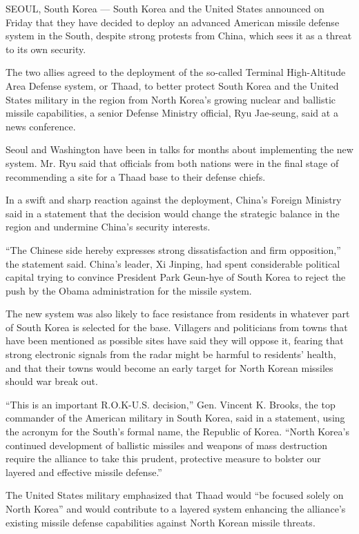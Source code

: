 SEOUL, South Korea --- South Korea and the United States announced on
Friday that they have decided to deploy an advanced American missile
defense system in the South, despite strong protests from China, which
sees it as a threat to its own security.

The two allies agreed to the deployment of the so-called Terminal
High-Altitude Area Defense system, or Thaad, to better protect South
Korea and the United States military in the region from North Korea's
growing nuclear and ballistic missile capabilities, a senior Defense
Ministry official, Ryu Jae-seung, said at a news conference.

Seoul and Washington have been in talks for months about implementing
the new system. Mr. Ryu said that officials from both nations were in
the final stage of recommending a site for a Thaad base to their defense
chiefs.

In a swift and sharp reaction against the deployment, China's Foreign
Ministry said in a statement that the decision would change the
strategic balance in the region and undermine China's security
interests.

``The Chinese side hereby expresses strong dissatisfaction and firm
opposition,'' the statement said. China's leader, Xi Jinping, had spent
considerable political capital trying to convince President Park
Geun-hye of South Korea to reject the push by the Obama administration
for the missile system.

The new system was also likely to face resistance from residents in
whatever part of South Korea is selected for the base. Villagers and
politicians from towns that have been mentioned as possible sites have
said they will oppose it, fearing that strong electronic signals from
the radar might be harmful to residents' health, and that their towns
would become an early target for North Korean missiles should war break
out.

``This is an important R.O.K-U.S. decision,'' Gen. Vincent K. Brooks,
the top commander of the American military in South Korea, said in a
statement, using the acronym for the South's formal name, the Republic
of Korea. ``North Korea's continued development of ballistic missiles
and weapons of mass destruction require the alliance to take this
prudent, protective measure to bolster our layered and effective missile
defense.''

The United States military emphasized that Thaad would ``be focused
solely on North Korea'' and would contribute to a layered system
enhancing the alliance's existing missile defense capabilities against
North Korean missile threats.

